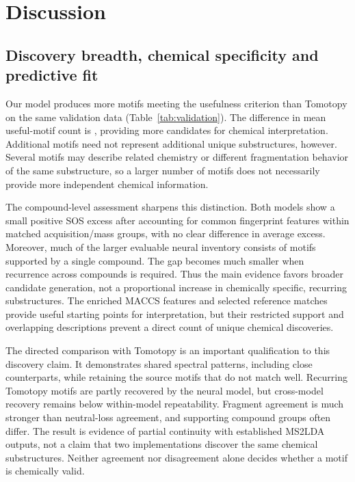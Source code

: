 \documentclass[10pt,a4paper]{article}
\begin{document}
\section{Discussion}
\label{sec:discussion}

\subsection{Discovery breadth, chemical specificity and predictive fit}

Our model produces more motifs meeting the usefulness criterion than Tomotopy
on the same validation data (Table~\ref{tab:validation}). The difference in
mean useful-motif count is \CurrentUsefulDifference{}, providing more candidates
for chemical interpretation. Additional motifs need not represent additional
unique substructures, however. Several motifs may describe related chemistry
or different fragmentation behavior of the same substructure, so a larger
number of motifs does not necessarily provide more independent chemical information.

The compound-level assessment sharpens this distinction. Both models show
a small positive SOS excess after accounting for common fingerprint features
within matched acquisition/mass groups, with no clear difference in average
excess. Moreover, much of the larger evaluable neural inventory consists
of motifs supported by a single compound. The gap becomes much smaller
when recurrence across compounds is required. Thus the main evidence favors
broader candidate generation, not a proportional increase in chemically
specific, recurring substructures. The enriched MACCS features and selected
reference matches provide useful starting points for interpretation, but
their restricted support and overlapping descriptions prevent a direct
count of unique chemical discoveries.

The directed comparison with Tomotopy is an important qualification to this
discovery claim. It demonstrates shared spectral patterns, including close
counterparts, while retaining the source motifs that do not match well.
Recurring Tomotopy motifs are partly recovered by the neural model, but
cross-model recovery remains below within-model repeatability. Fragment
agreement is much stronger than neutral-loss agreement, and supporting
compound groups often differ. The result is evidence of partial continuity
with established MS2LDA outputs, not a claim that two implementations discover
the same chemical substructures. Neither agreement nor disagreement alone
decides whether a motif is chemically valid.
\end{document}
